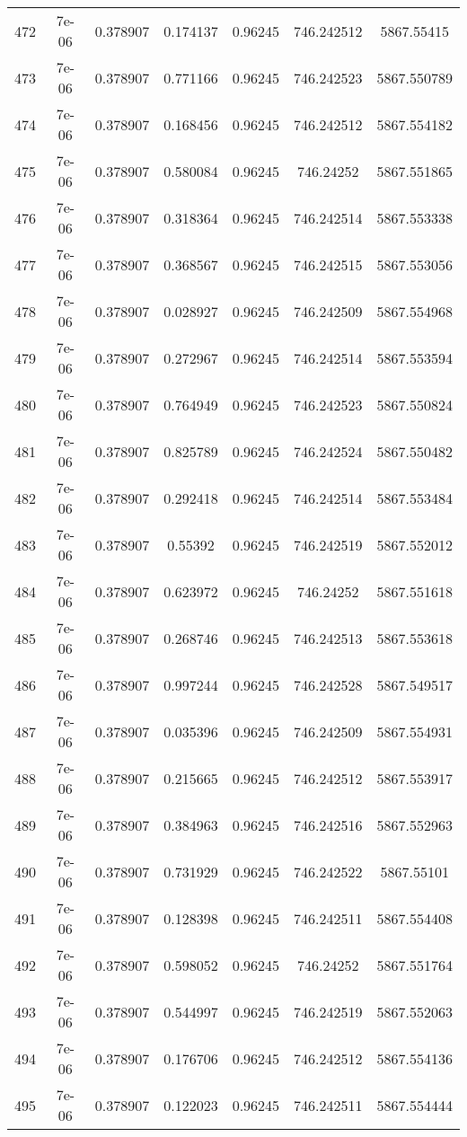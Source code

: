 \begin{table}
\begin{tabular*}{\linewidth}{c|c|c|c|c|c|c}
472 & 7e-06 & 0.378907 & 0.174137 & 0.96245 & 746.242512 & 5867.55415\\
473 & 7e-06 & 0.378907 & 0.771166 & 0.96245 & 746.242523 & 5867.550789\\
474 & 7e-06 & 0.378907 & 0.168456 & 0.96245 & 746.242512 & 5867.554182\\
475 & 7e-06 & 0.378907 & 0.580084 & 0.96245 & 746.24252 & 5867.551865\\
476 & 7e-06 & 0.378907 & 0.318364 & 0.96245 & 746.242514 & 5867.553338\\
477 & 7e-06 & 0.378907 & 0.368567 & 0.96245 & 746.242515 & 5867.553056\\
478 & 7e-06 & 0.378907 & 0.028927 & 0.96245 & 746.242509 & 5867.554968\\
479 & 7e-06 & 0.378907 & 0.272967 & 0.96245 & 746.242514 & 5867.553594\\
480 & 7e-06 & 0.378907 & 0.764949 & 0.96245 & 746.242523 & 5867.550824\\
481 & 7e-06 & 0.378907 & 0.825789 & 0.96245 & 746.242524 & 5867.550482\\
482 & 7e-06 & 0.378907 & 0.292418 & 0.96245 & 746.242514 & 5867.553484\\
483 & 7e-06 & 0.378907 & 0.55392 & 0.96245 & 746.242519 & 5867.552012\\
484 & 7e-06 & 0.378907 & 0.623972 & 0.96245 & 746.24252 & 5867.551618\\
485 & 7e-06 & 0.378907 & 0.268746 & 0.96245 & 746.242513 & 5867.553618\\
486 & 7e-06 & 0.378907 & 0.997244 & 0.96245 & 746.242528 & 5867.549517\\
487 & 7e-06 & 0.378907 & 0.035396 & 0.96245 & 746.242509 & 5867.554931\\
488 & 7e-06 & 0.378907 & 0.215665 & 0.96245 & 746.242512 & 5867.553917\\
489 & 7e-06 & 0.378907 & 0.384963 & 0.96245 & 746.242516 & 5867.552963\\
490 & 7e-06 & 0.378907 & 0.731929 & 0.96245 & 746.242522 & 5867.55101\\
491 & 7e-06 & 0.378907 & 0.128398 & 0.96245 & 746.242511 & 5867.554408\\
492 & 7e-06 & 0.378907 & 0.598052 & 0.96245 & 746.24252 & 5867.551764\\
493 & 7e-06 & 0.378907 & 0.544997 & 0.96245 & 746.242519 & 5867.552063\\
494 & 7e-06 & 0.378907 & 0.176706 & 0.96245 & 746.242512 & 5867.554136\\
495 & 7e-06 & 0.378907 & 0.122023 & 0.96245 & 746.242511 & 5867.554444\\
\end{tabular*}
\end{table}
